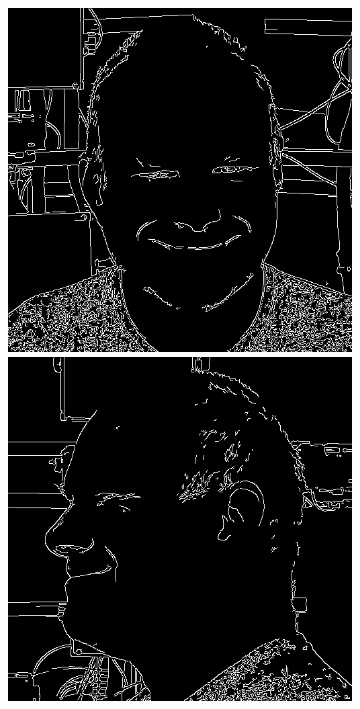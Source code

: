 \begin{figure}[ht]
\begin{subfigure}{0.18\linewidth}
        \includegraphics[width=\textwidth]{Figures/failed/controlnet/canny/0-2-4-2-293_210300_829_canny.png}
        \includegraphics[width=\textwidth]{Figures/failed/controlnet/canny/0-C-5-1-5386_212530_574_canny.png}

\end{subfigure}
\end{figure}
